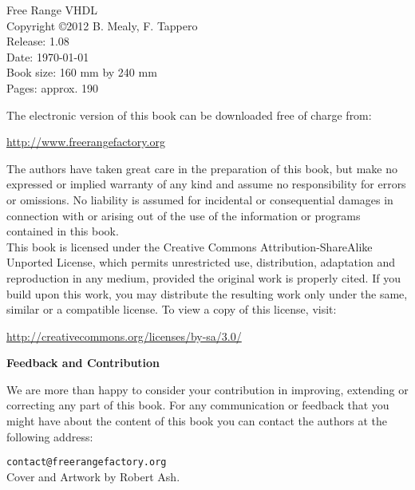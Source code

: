 %
%
%
\setcounter{page}{1}

{\footnotesize
\noindent
Free Range VHDL\\
Copyright \copyright 2012 B. Mealy, F. Tappero\\
Release: 1.08\\
Date: \today\\
Book size: 160 mm by 240 mm\\
Pages: approx. 190\\
\vspace{20pt}

\noindent
The electronic version of this book can be downloaded free of charge from:

\noindent
\url{http://www.freerangefactory.org}

\vspace{15pt}

\noindent
The authors have taken great care in the preparation of this book, but make no expressed or implied warranty of any kind and assume no responsibility for errors or omissions. No liability is assumed for incidental or consequential damages in connection with or arising out of the use of the information or programs contained in this book.\\

\noindent
This book is licensed under the Creative Commons Attribution-ShareAlike Unported License, which permits unrestricted use, distribution, adaptation and reproduction in any medium, provided the original work is properly cited. If you build upon this work, you may distribute the resulting work only under the same, similar or a compatible license. To view a copy of this license, visit:

\noindent
\url{http://creativecommons.org/licenses/by-sa/3.0/}
\vspace{25pt}

\noindent
{\sffamily\bfseries Feedback and Contribution}

\noindent
We are more than happy to consider your contribution in improving, extending or correcting any part of this book.
For any communication or feedback that you might have about the content of this book you can contact the authors at the following address:

\noindent
\texttt{contact@freerangefactory.org}\\

\vfill
\noindent
Cover and Artwork by Robert Ash.

} %
